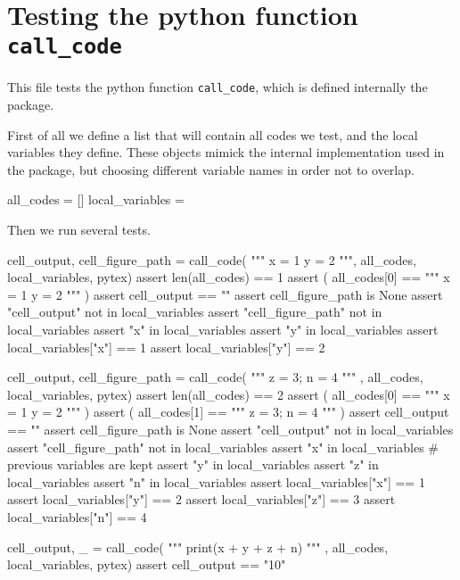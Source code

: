 \documentclass{book}
\begin{document}
\chapter{Testing the python function \texttt{call\_code}}

This file tests the python function \texttt{call\_code}, which is defined internally the package.

First of all we define a list that will contain all codes we test, and the local variables they define. These objects mimick the internal implementation used in the package, but choosing different variable names in order not to overlap.

\begin{pycell}
all_codes = []
local_variables = {}
\end{pycell}

Then we run several tests.

\begin{pycell}
cell_output, cell_figure_path = call_code(
"""
x = 1
y = 2
""",
all_codes, local_variables, pytex)
assert len(all_codes) == 1
assert (
    all_codes[0] == """
x = 1
y = 2
"""
)
assert cell_output == ""
assert cell_figure_path is None
assert "cell_output" not in local_variables
assert "cell_figure_path" not in local_variables
assert "x" in local_variables
assert "y" in local_variables
assert local_variables["x"] == 1
assert local_variables["y"] == 2
\end{pycell}

\begin{pycell}
cell_output, cell_figure_path = call_code(
"""
z = 3; n = 4
"""
,
all_codes, local_variables, pytex)
assert len(all_codes) == 2
assert (
    all_codes[0] == """
x = 1
y = 2
"""
)
assert (
    all_codes[1] == """
z = 3; n = 4
"""
)
assert cell_output == ""
assert cell_figure_path is None
assert "cell_output" not in local_variables
assert "cell_figure_path" not in local_variables
assert "x" in local_variables  # previous variables are kept
assert "y" in local_variables
assert "z" in local_variables
assert "n" in local_variables
assert local_variables["x"] == 1
assert local_variables["y"] == 2
assert local_variables["z"] == 3
assert local_variables["n"] == 4
\end{pycell}

\begin{pycell}
cell_output, _ = call_code(
"""
print(x + y + z + n)
"""
,
all_codes, local_variables, pytex)
assert cell_output == "10"
\end{pycell}
\end{document}

